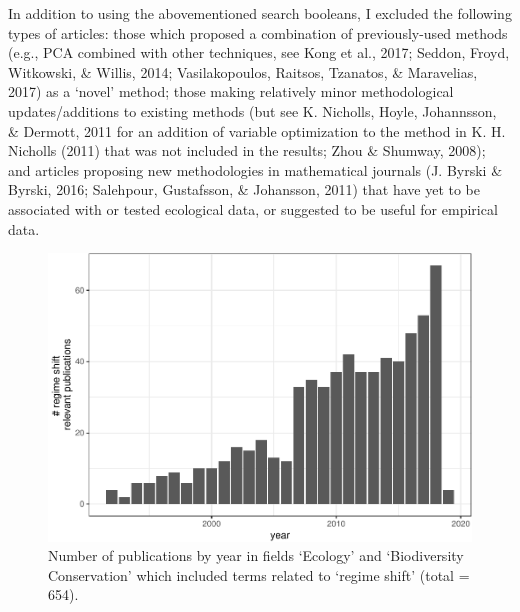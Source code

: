 \documentclass[12pt,twoside,openany]{reedthesis}
\begin{document}
In addition to using the abovementioned search booleans, I excluded the
following types of articles: those which proposed a combination of
previously-used methods (e.g., PCA combined with other techniques, see
Kong et al., 2017; Seddon, Froyd, Witkowski, \& Willis, 2014;
Vasilakopoulos, Raitsos, Tzanatos, \& Maravelias, 2017) as a `novel'
method; those making relatively minor methodological updates/additions
to existing methods (but see K. Nicholls, Hoyle, Johannsson, \& Dermott,
2011 for an addition of variable optimization to the method in K. H.
Nicholls (2011) that was not included in the results; Zhou \& Shumway,
2008); and articles proposing new methodologies in mathematical journals
(J. Byrski \& Byrski, 2016; Salehpour, Gustafsson, \& Johansson, 2011)
that have yet to be associated with or tested ecological data, or
suggested to be useful for empirical data.
\begin{figure}
\centering
\includegraphics{_myDissertation_files/figure-latex/wosRegimePubsByYear-1.pdf}
\caption{\label{fig:wosRegimePubsByYear}Number of publications by year in
fields `Ecology' and `Biodiversity Conservation' which included terms
related to `regime shift' (total = 654).}
\end{figure}
\end{document}
